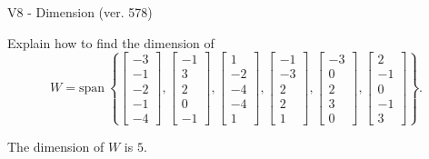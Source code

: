 \begin{exercise}
  \begin{exerciseTitle}V8 - Dimension (ver. 578)\end{exerciseTitle}
  \begin{exerciseStatement}
    Explain how to find the dimension of 
\[W=\mathrm{span}\ \left\{\left[\begin{array}{r}
-3 \\
-1 \\
-2 \\
-1 \\
-4
\end{array}\right] , \left[\begin{array}{r}
-1 \\
3 \\
2 \\
0 \\
-1
\end{array}\right] , \left[\begin{array}{r}
1 \\
-2 \\
-4 \\
-4 \\
1
\end{array}\right] , \left[\begin{array}{r}
-1 \\
-3 \\
2 \\
2 \\
1
\end{array}\right] , \left[\begin{array}{r}
-3 \\
0 \\
2 \\
3 \\
0
\end{array}\right] , \left[\begin{array}{r}
2 \\
-1 \\
0 \\
-1 \\
3
\end{array}\right]\right\}.\]



  \end{exerciseStatement}
  \begin{exerciseAnswer}
   The dimension of \(W\) is  \(5\).
  


  \end{exerciseAnswer}
\end{exercise}